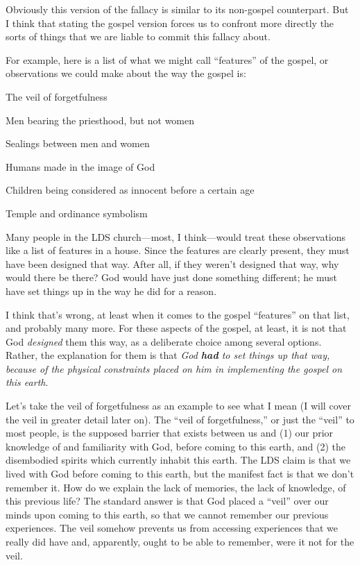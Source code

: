		Obviously this version of the fallacy is similar to its non-gospel counterpart. But I think that stating the gospel version forces us to confront more directly the sorts of things that we are liable to commit this fallacy about.

		For example, here is a list of what we might call ``features'' of the gospel, or observations we could make about the way the gospel is:
		
			\begin{compactitem}
				\item The veil of forgetfulness
				\item Men bearing the priesthood, but not women
				\item Sealings between men and women
				\item Humans made in the image of God
				\item Children being considered as innocent before a certain age
				\item Temple and ordinance symbolism
			\end{compactitem}
		
		Many people in the LDS church---most, I think---would treat these observations like a list of features in a house. Since the features are clearly present, they must have been designed that way. After all, if they weren't designed that way, why would there be there? God would have just done something different; he must have set things up in the way he did for a reason.
		
		I think that's wrong, at least when it comes to the gospel ``features'' on that list, and probably many more. For these aspects of the gospel, at least, it is not that God \textit{designed} them this way, as a deliberate choice among several options. Rather, the explanation for them is that \textit{God \textbf{had} to set things up that way, because of the physical constraints placed on him in implementing the gospel on this earth}.
		
		Let's take the veil of forgetfulness as an example to see what I mean (I will cover the veil in greater detail later on). The ``veil of forgetfulness,'' or just the ``veil'' to most people, is the supposed barrier that exists between us and (1) our prior knowledge of and familiarity with God, before coming to this earth, and (2) the disembodied spirits which currently inhabit this earth. The LDS claim is that we lived with God before coming to this earth, but the manifest fact is that we don't remember it. How do we explain the lack of memories, the lack of knowledge, of this previous life? The standard answer is that God placed a ``veil'' over our minds upon coming to this earth, so that we cannot remember our previous experiences. The veil somehow prevents us from accessing experiences that we really did have and, apparently, ought to be able to remember, were it not for the veil.
		
